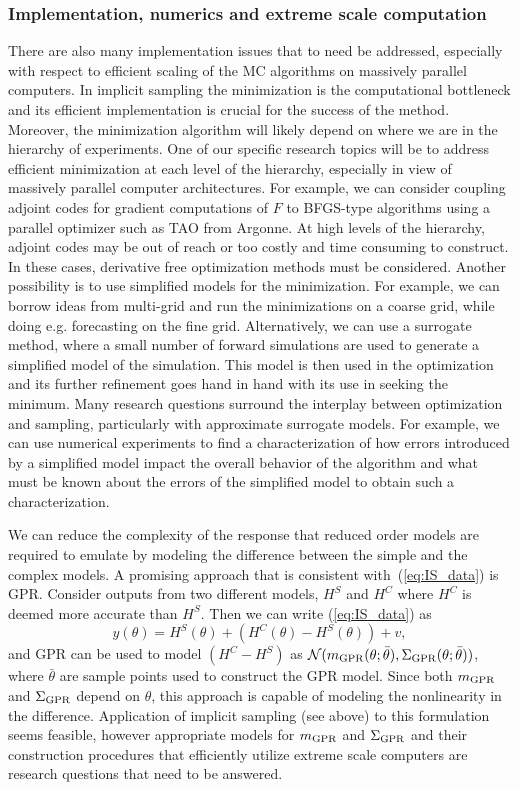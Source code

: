 \documentclass[11pt]{article}
\begin{document}
\subsubsection*{Implementation, numerics and extreme scale computation}
There are also many implementation issues that to need be addressed, especially with respect to efficient scaling of the MC algorithms on massively parallel computers.
In implicit sampling the minimization is the computational bottleneck and its efficient implementation is crucial for the success of the method.
Moreover, the minimization algorithm will likely depend on where we are in the hierarchy of experiments.
One of our specific research topics will be to address efficient minimization at each level of the hierarchy, especially in view of massively parallel computer architectures.
For example, we can consider coupling adjoint codes for gradient computations of $F$ to BFGS-type algorithms using a parallel optimizer such as TAO from Argonne.
At high levels of the hierarchy, adjoint codes may be out of reach or too costly and time consuming to construct.
In these cases, derivative free optimization methods must be considered.
Another possibility is to use simplified models for the minimization.
For example, we can borrow ideas from multi-grid and run the minimizations on a coarse grid, while doing e.g. forecasting on the fine grid.
Alternatively, we can use a surrogate method, where a small number of forward simulations are used to generate a simplified model of the simulation.
This model is then used in the optimization and its further refinement goes hand in hand with its use in seeking the minimum.
Many research questions surround the interplay between optimization and sampling, particularly with approximate surrogate models.
For example, we can use numerical experiments to find a characterization of how errors introduced by a simplified model impact the overall behavior of the algorithm and what must be known about the errors of the simplified model to obtain such a characterization.  

We can reduce the complexity of the response that reduced order models are required to emulate by modeling the difference between the simple and the complex models. A promising approach that is consistent with~(\ref{eq:IS_data}) is GPR. 
Consider outputs from two different models, $H^S$ and $H^C$ where $H^C$ is deemed more accurate than $H^S$. 
Then we can write (\ref{eq:IS_data}) as 
\begin{equation}
y(\theta) = H^S(\theta) + (H^C(\theta) - H^S(\theta)) + v,
\end{equation}
and GPR can be used to model  $(H^C - H^S)$ as $\mathcal{N}(m_{\rm GPR}(\theta;\bar{\theta}),\Sigma_{\rm GPR}(\theta;\bar{\theta}))$, where $\bar{\theta}$ are sample points used to construct the GPR model. Since both $m_{\rm GPR}$ and $\Sigma_{\rm GPR}$ depend on $\theta$, this approach is capable of modeling the nonlinearity in the difference. Application of implicit sampling (see above) to this  formulation seems feasible, however appropriate models for $m_{\rm GPR}$ and $\Sigma_{\rm GPR}$ and their construction procedures that efficiently utilize extreme scale computers are research questions that need to be answered. 
\end{document}
